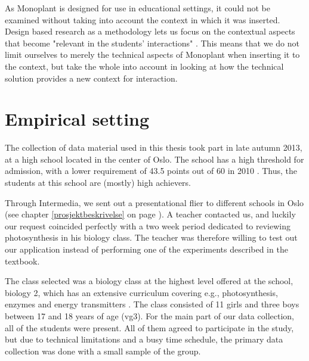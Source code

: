 
As Monoplant is designed for use in educational settings, it could not be examined without taking into account the context in which it was inserted. Design based research as a methodology lets us focus on the contextual aspects that become "relevant in the students' interactions" \citep{krange2009historical}. This means that we do not limit ourselves to merely the technical aspects of Monoplant when inserting it to the context, but take the whole into account in looking at how the technical solution provides a new context for interaction. 


\section{Empirical setting}
The collection of data material used in this thesis took part in late autumn 2013, at a high school located in the center of Oslo. The school has a high threshold for admission, with a lower requirement of 43.5 points out of 60 in 2010 \citep{utdanningsetaten}. Thus, the students at this school are (mostly) high achievers. 

Through Intermedia, we sent out a presentational flier to different schools in Oslo (see chapter \ref{prosjektbeskrivelse} on page \pageref{prosjektbeskrivelse}). A teacher contacted us, and luckily our request coincided perfectly with a two week period dedicated to reviewing photosynthesis in his biology class. The teacher was therefore willing to test out our application instead of performing one of the experiments described in the textbook. 

The class selected was a biology class at the highest level offered at the school, biology 2, which has an extensive curriculum covering e.g., photosynthesis, enzymes and energy transmitters \citep{bios}. The class consisted of 11 girls and three boys between 17 and 18 years of age (vg3). For the main part of our data collection, all of the students were present. All of them agreed to participate in the study, but due to technical limitations and a busy time schedule, the primary data collection was  done with a small sample of the group. 


